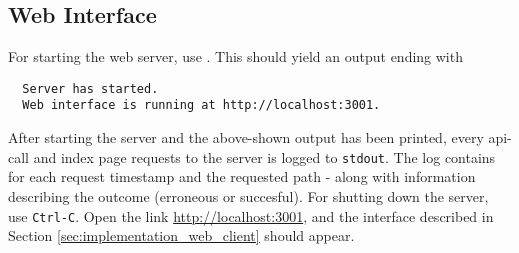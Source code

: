 \subsection{Web Interface}

For starting the web server, use . This should yield an output ending with
\begin{lstlisting}
  Server has started.
  Web interface is running at http://localhost:3001.
\end{lstlisting}

\noindent
After starting the server and the above-shown output has been printed, every api-call and index page requests to the server is logged to \texttt{stdout}.
The log contains for each request timestamp and the requested path - along with information describing the outcome (erroneous or succesful).
For shutting down the server, use \texttt{Ctrl-C}.
Open the link \url{http://localhost:3001}, and the interface described in Section \ref{sec:implementation_web_client} should appear.\\
